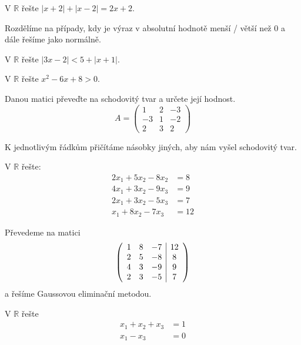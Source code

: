 \begin{priklad}
V $\mathbb R$ řešte $|x+2|+|x-2|=2x+2.$
\end{priklad}

\begin{reseni}
Rozdělíme na případy, kdy je výraz v absolutní hodnotě menší / větší než 0
a dále řešíme jako normálně.
\end{reseni}

\begin{priklad}
V $\mathbb R$ řešte $|3x-2|<5+|x+1|.$
\end{priklad}

\begin{priklad}
V $\mathbb R$ řešte $x^2-6x+8 >0.$
\end{priklad}

\begin{priklad}
Danou matici převeďte na schodovitý tvar a určete její hodnost.
$$A=\begin{pmatrix}
    1 & 2 & -3 \\
    -3 & 1 & -2 \\
    2 & 3 & 2
\end{pmatrix}$$
\end{priklad}

\begin{reseni}
K jednotlivým řádkům přičítáme násobky jiných, aby nám vyšel schodovitý tvar.
\end{reseni}

\begin{priklad}
V $\mathbb R$ řešte:
\begin{align*}
    2x_1+5x_2-8x_2 & =8 \\
    4x_1 + 3x_2 - 9x_3 & =9\\
    2x_1 + 3x_2 - 5x_3 & = 7 \\
    x_1 + 8x_2 - 7x_3 & = 12
\end{align*}
\end{priklad}

\begin{reseni}
Převedeme na matici
$$
\left (
\begin{array}{c c c | c }
1 & 8& -7& 12\\
2& 5& -8& 8\\
4& 3& -9& 9\\
2& 3& -5& 7
\end{array}
\right )
$$
a řešíme Gaussovou eliminační metodou.
\end{reseni}

\begin{priklad}
V $\mathbb R$ řešte
\begin{align*}
    x_1+x_2+x_3&=1\\
    x_1-x_3 &=0
\end{align*}
\end{priklad}

